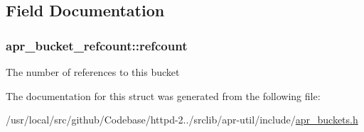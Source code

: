 \subsection{Field Documentation}
\subsubsection[{\texorpdfstring{refcount}{refcount}}]{ apr\+\_\+bucket\+\_\+refcount\+::refcount}\hypertarget{structapr__bucket__refcount_a75040af03e3ad3c722bccea1048e3dae}{}\label{structapr__bucket__refcount_a75040af03e3ad3c722bccea1048e3dae}
The number of references to this bucket 

The documentation for this struct was generated from the following file\+:\begin{DoxyCompactItemize}
\item 
/usr/local/src/github/\+Codebase/httpd-\/2../srclib/apr-\/util/include/\hyperlink{apr__buckets_8h}{apr\+\_\+buckets.\+h}\end{DoxyCompactItemize}
